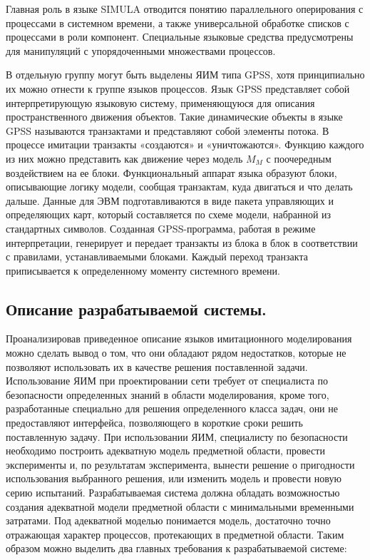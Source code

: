     Главная роль в языке SIMULA отводится понятию параллельного оперирования с процессами в системном времени, а также универсальной обработке списков с процессами в роли компонент. Специальные языковые средства предусмотрены для манипуляций с упорядоченными множествами процессов.

    В отдельную группу могут быть выделены ЯИМ типа GPSS, хотя принципиально их можно отнести к группе языков процессов. Язык GPSS представляет собой интерпретирующую языковую систему, применяющуюся для описания  пространственного движения объектов. Такие динамические объекты в языке GPSS называются транзактами и представляют собой элементы потока. В процессе имитации транзакты «создаются» и «уничтожаются». Функцию каждого из них можно представить как движение через модель $M_{M}$ с поочередным воздействием на ее блоки. Функциональный аппарат языка образуют блоки, описывающие логику модели, сообщая транзактам, куда двигаться и что делать дальше. Данные для ЭВМ подготавливаются в виде пакета управляющих и определяющих карт, который составляется по схеме модели, набранной из стандартных символов. Созданная GPSS-программа, работая в режиме интерпретации, генерирует и передает транзакты из блока в блок в соответствии с правилами, устанавливаемыми блоками. Каждый переход транзакта приписывается к  определенному моменту системного времени.


\subsection{Описание разрабатываемой системы.}

    Проанализировав приведенное описание языков имитационного моделирования можно сделать вывод о том, что они обладают рядом недостатков, которые не позволяют использовать их в качестве решения поставленной задачи. Использование ЯИМ при проектировании сети требует от специалиста по безопасности определенных знаний в области моделирования, кроме того, разработанные специально для решения определенного класса задач, они не предоставляют интерфейса, позволяющего в короткие сроки решить поставленную задачу. При использовании ЯИМ, специалисту по безопасности необходимо построить адекватную модель предметной области, провести эксперименты и, по результатам эксперимента, вынести решение о пригодности использования выбранного решения, или изменить модель и провести новую серию испытаний.
    Разрабатываемая система должна обладать возможностью создания адекватной модели предметной области с минимальными временными затратами. Под адекватной моделью понимается модель, достаточно точно отражающая характер процессов, протекающих в предметной области. Таким образом можно выделить два главных требования к разрабатываемой системе:

